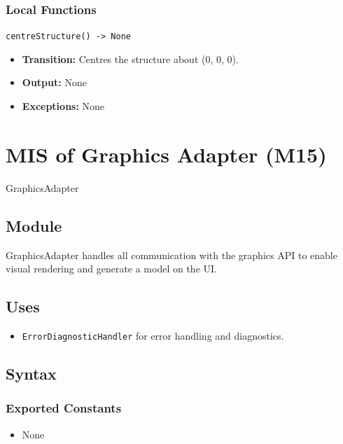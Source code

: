 \documentclass[12pt, titlepage]{article}
\begin{document}
\subsubsection{Local Functions}
\texttt{centreStructure() -> None}
\begin{itemize}
  \item \textbf{Transition:} Centres the structure about (0, 0, 0).
  \item \textbf{Output:} None
  \item \textbf{Exceptions:} None
\end{itemize}

\newpage

\section{MIS of Graphics Adapter (M15)}\label{Module18}

GraphicsAdapter

\subsection{Module}
GraphicsAdapter handles all communication with the graphics API to enable visual rendering and generate a model on the UI.

\subsection{Uses}
\begin{itemize}
  \item \texttt{ErrorDiagnosticHandler} for error handling and diagnostics.
\end{itemize}

\subsection{Syntax}

\subsubsection{Exported Constants}
\begin{itemize}
  \item None
\end{itemize}
\end{document}

